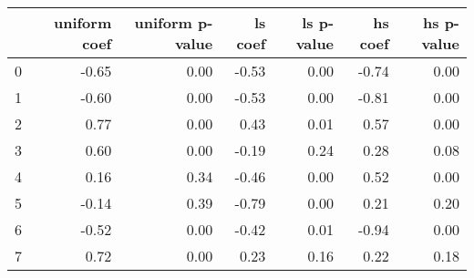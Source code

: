 \begin{tabular}{lrrrrrr}
\toprule
 & uniform coef & uniform p-value & ls coef & ls p-value & hs coef & hs p-value \\
\midrule
0 & -0.65 & 0.00 & -0.53 & 0.00 & -0.74 & 0.00 \\
1 & -0.60 & 0.00 & -0.53 & 0.00 & -0.81 & 0.00 \\
2 & 0.77 & 0.00 & 0.43 & 0.01 & 0.57 & 0.00 \\
3 & 0.60 & 0.00 & -0.19 & 0.24 & 0.28 & 0.08 \\
4 & 0.16 & 0.34 & -0.46 & 0.00 & 0.52 & 0.00 \\
5 & -0.14 & 0.39 & -0.79 & 0.00 & 0.21 & 0.20 \\
6 & -0.52 & 0.00 & -0.42 & 0.01 & -0.94 & 0.00 \\
7 & 0.72 & 0.00 & 0.23 & 0.16 & 0.22 & 0.18 \\
\bottomrule
\end{tabular}
